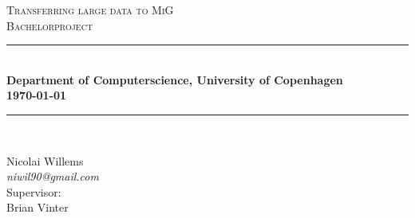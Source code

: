 \newcommand{\HRule}{\rule{\linewidth}{0.5mm}}

\begin{titlepage}

\begin{center}

\textsc{\LARGE Transferring large data to MiG}\\[1.5cm]

\textsc{\Large Bachelorproject}\\[0.5cm]

\HRule \\[0.4cm]

{ \bfseries Department of Computerscience, University of Copenhagen \\[0.5cm] 
    {\small \today}} \\[0.7cm]

\HRule \\ [6.5cm]

\begin{minipage}{0.5\textwidth}
\begin{flushleft} \large
Nicolai Willems \\
\textit{niwil90@gmail.com}\\[0.2cm]

Supervisor: \\
{\small
Brian Vinter \\
}
\end{flushleft}
\end{minipage}

\vfill 



\end{center}

\end{titlepage}
\clearpage


